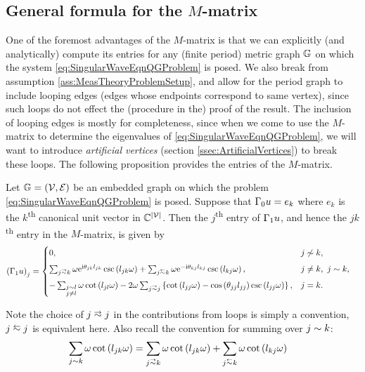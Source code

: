 \subsection{General formula for the $M$-matrix} \label{ssec:MMatrixResult}
One of the foremost advantages of the $M$-matrix is that we can explicitly (and analytically) compute its entries for any (finite period) metric graph $\mathbb{G}$ on which the system \eqref{eq:SingularWaveEqnQGProblem} is posed.
We also break from assumption \ref{ass:MeasTheoryProblemSetup}, and allow for the period graph to include looping edges (edges whose endpoints correspond to same vertex), since such loops do not effect the (procedure in the) proof of the result.
The inclusion of looping edges is mostly for completeness, since when we come to use the $M$-matrix to determine the eigenvalues of \eqref{eq:SingularWaveEqnQGProblem}, we will want to introduce \emph{artificial vertices} (section \ref{ssec:ArtificialVertices}) to break these loops.
The following proposition provides the entries of the $M$-matrix.
\begin{prop} \label{prop:M-MatrixEntries}
	Let $\mathbb{G}=\left( \mathcal{V},\mathcal{E} \right)$ be an embedded graph on which the problem \eqref{eq:SingularWaveEqnQGProblem} is posed.
	Suppose that $\Gamma_0 u = e_k$ where $e_k$ is the $k$\textsuperscript{th} canonical unit vector in $\mathbb{C}^{\left\lvert \mathcal{V} \right\rvert}$.
	Then the $j$\textsuperscript{th} entry of $\Gamma_1 u$, and hence the $jk$\textsuperscript{th} entry in the $M$-matrix, is given by
	\begin{align*}
		\bracs{\nmap u}_j &= 
		\begin{cases}
			0,	
			& j \not\con k, \\[5pt]
			\sum_{j\conLeft k} \omega \e^{\rmi\qm_{jk}l_{jk}} \csc\bracs{l_{jk}\omega} 
			+ \sum_{j\conRight k} \omega \e^{-\rmi\qm_{kj}l_{kj}} \csc\bracs{l_{kj}\omega},
			& j\neq k, \ j\con k, \\[5pt]
			- \sum_{\substack{j\con l \\ j\neq l}} \omega\cot\bracs{l_{jl}\omega}
			- 2\omega\sum_{j\conLeft j} \clbracs{ \cot\bracs{l_{jj}\omega} - \cos\bracs{\qm_{jj}l_{jj}}\csc\bracs{l_{jj}\omega} },
			& j=k.
		\end{cases}
	\end{align*}
\end{prop}
Note the choice of $j\conLeft j$ in the contributions from loops is simply a convention, $j\conRight j$ is equivalent here.
Also recall the convention for summing over $j\sim k$:
\begin{align*}
	\sum_{j\con k} \omega\cot\bracs{l_{jk}\omega} &= \sum_{j\conLeft k} \omega\cot\bracs{l_{jk}\omega}	+ \sum_{j\conRight k} \omega\cot\bracs{l_{kj}\omega}
\end{align*}
